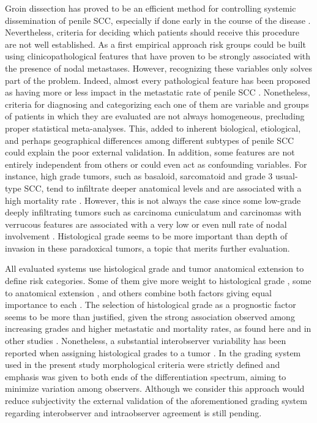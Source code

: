 \documentclass[11pt,letterpaper]{article}\usepackage[]{graphicx}\usepackage[]{color}
\begin{document}
\begin{multicols}{2}
Groin dissection has proved to be an efficient method for controlling systemic dissemination of penile SCC, especially if done early in the course of the disease \cite{Hungerhuber2006,Kroon2005}. Nevertheless, criteria for deciding which patients should receive this procedure are not well established. As a first empirical approach risk groups could be built using clinicopathological features that have proven to be strongly associated with the presence of nodal metastases. However, recognizing these variables only solves part of the problem. Indeed, almost every pathological feature has been proposed as having more or less impact in the metastatic rate of penile SCC \cite{Novara2007,Chaux2012}. Nonetheless, criteria for diagnosing and categorizing each one of them are variable and groups of patients in which they are evaluated are not always homogeneous, precluding proper statistical meta-analyses. This, added to inherent biological, etiological, and perhaps geographical differences among different subtypes of penile SCC could explain the poor external validation. In addition, some features are not entirely independent from others or could even act as confounding variables. For instance, high grade tumors, such as basaloid, sarcomatoid and grade 3 usual-type SCC, tend to infiltrate deeper anatomical levels and are associated with a high mortality rate \cite{Guimaraes2009,Chaux2009a,Chaux2012}. However, this is not always the case since some low-grade deeply infiltrating tumors such as carcinoma cuniculatum and carcinomas with verrucous features are associated with a very low or even null rate of nodal involvement \cite{Guimaraes2009,Chaux2012,Barreto2007}. Histological grade seems to be more important than depth of invasion in these paradoxical tumors, a topic that merits further evaluation.

All evaluated systems use histological grade and tumor anatomical extension to define risk categories. Some of them give more weight to histological grade \cite{Hungerhuber2006}, some to anatomical extension \cite{Solsona2004}, and others combine both factors giving equal importance to each \cite{Solsona2001}. The selection of histological grade as a prognostic factor seems to be more than justified, given the strong association observed among increasing grades and higher metastatic and mortality rates, as found here and in other studies \cite{Slaton2001,Chaux2009b}. Nonetheless, a substantial interobserver variability has been reported when assigning histological grades to a tumor \cite{Naumann2009}. In the grading system used in the present study \cite{Chaux2009b} morphological criteria were strictly defined and emphasis was given to both ends of the differentiation spectrum, aiming to minimize variation among observers. Although we consider this approach would reduce subjectivity the external validation of the aforementioned grading system regarding interobserver and intraobserver agreement is still pending.


\end{multicols}
\end{document}
